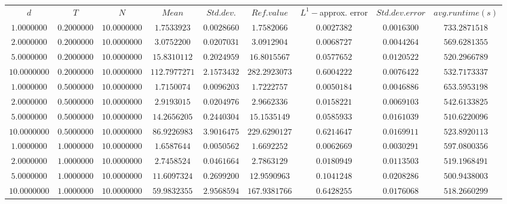 \begin{tabular}{ccccccccc}
$d$ & $T$ & $N$ & $Mean$ & $Std. dev.$ & $Ref. value$ & $L^1-$approx. error & $Std. dev. error$ & $avg. runtime (s)$\\
$1.0000000$ & $0.2000000$ & $10.0000000$ & $1.7533923$ & $0.0028660$ & $1.7582066$ & $0.0027382$ & $0.0016300$ & $733.2871518$\\
$2.0000000$ & $0.2000000$ & $10.0000000$ & $3.0752200$ & $0.0207031$ & $3.0912904$ & $0.0068727$ & $0.0044264$ & $569.6281355$\\
$5.0000000$ & $0.2000000$ & $10.0000000$ & $15.8310112$ & $0.2024959$ & $16.8015567$ & $0.0577652$ & $0.0120522$ & $520.2966789$\\
$10.0000000$ & $0.2000000$ & $10.0000000$ & $112.7977271$ & $2.1573432$ & $282.2923073$ & $0.6004222$ & $0.0076422$ & $532.7173337$\\
$1.0000000$ & $0.5000000$ & $10.0000000$ & $1.7150074$ & $0.0096203$ & $1.7222757$ & $0.0050184$ & $0.0046886$ & $653.5953198$\\
$2.0000000$ & $0.5000000$ & $10.0000000$ & $2.9193015$ & $0.0204976$ & $2.9662336$ & $0.0158221$ & $0.0069103$ & $542.6133825$\\
$5.0000000$ & $0.5000000$ & $10.0000000$ & $14.2656205$ & $0.2440304$ & $15.1535149$ & $0.0585933$ & $0.0161039$ & $510.6220096$\\
$10.0000000$ & $0.5000000$ & $10.0000000$ & $86.9226983$ & $3.9016475$ & $229.6290127$ & $0.6214647$ & $0.0169911$ & $523.8920113$\\
$1.0000000$ & $1.0000000$ & $10.0000000$ & $1.6587644$ & $0.0050562$ & $1.6692252$ & $0.0062669$ & $0.0030291$ & $597.0800356$\\
$2.0000000$ & $1.0000000$ & $10.0000000$ & $2.7458524$ & $0.0461664$ & $2.7863129$ & $0.0180949$ & $0.0113503$ & $519.1968491$\\
$5.0000000$ & $1.0000000$ & $10.0000000$ & $11.6097324$ & $0.2699200$ & $12.9590963$ & $0.1041248$ & $0.0208286$ & $500.9438003$\\
$10.0000000$ & $1.0000000$ & $10.0000000$ & $59.9832355$ & $2.9568594$ & $167.9381766$ & $0.6428255$ & $0.0176068$ & $518.2660299$\\
\end{tabular}
